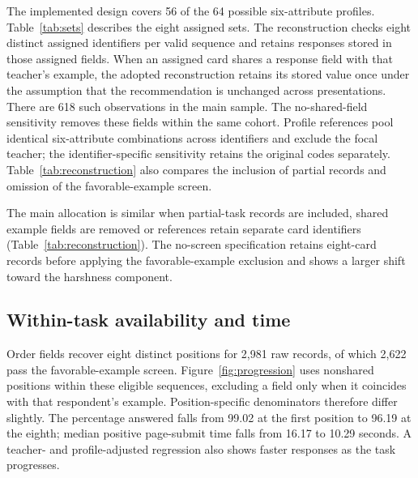 The implemented design covers 56 of the 64 possible six-attribute profiles. Table~\ref{tab:sets} describes the eight assigned sets. The reconstruction checks eight distinct assigned identifiers per valid sequence and retains responses stored in those assigned fields. When an assigned card shares a response field with that teacher's example, the adopted reconstruction retains its stored value once under the assumption that the recommendation is unchanged across presentations. There are 618 such observations in the main sample. The no-shared-field sensitivity removes these fields within the same cohort. Profile references pool identical six-attribute combinations across identifiers and exclude the focal teacher; the identifier-specific sensitivity retains the original codes separately. Table~\ref{tab:reconstruction} also compares the inclusion of partial records and omission of the favorable-example screen.

The main allocation is similar when partial-task records are included, shared example fields are removed or references retain separate card identifiers (Table~\ref{tab:reconstruction}). The no-screen specification retains eight-card records before applying the favorable-example exclusion and shows a larger shift toward the harshness component.


\subsection{Within-task availability and time}
Order fields recover eight distinct positions for 2,981 raw records, of which 2,622 pass the favorable-example screen. Figure~\ref{fig:progression} uses nonshared positions within these eligible sequences, excluding a field only when it coincides with that respondent's example. Position-specific denominators therefore differ slightly. The percentage answered falls from 99.02 at the first position to 96.19 at the eighth; median positive page-submit time falls from 16.17 to 10.29 seconds. A teacher- and profile-adjusted regression also shows faster responses as the task progresses.

